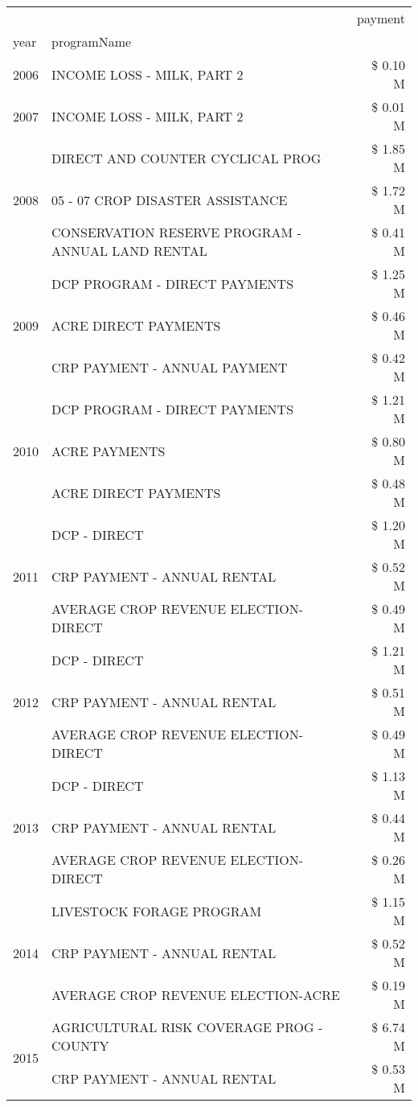 \begin{tabular}{llr}
\toprule
 &  & payment \\
year & programName &  \\
\midrule
2006 & INCOME LOSS - MILK, PART 2 & \$ 0.10 M \\
\cline{1-3}
2007 & INCOME LOSS - MILK, PART 2 & \$ 0.01 M \\
\cline{1-3}
\multirow[t]{3}{*}{2008} & DIRECT AND COUNTER CYCLICAL PROG & \$ 1.85 M \\
 & 05 - 07 CROP DISASTER ASSISTANCE & \$ 1.72 M \\
 & CONSERVATION RESERVE PROGRAM - ANNUAL LAND RENTAL & \$ 0.41 M \\
\cline{1-3}
\multirow[t]{3}{*}{2009} & DCP PROGRAM - DIRECT PAYMENTS & \$ 1.25 M \\
 & ACRE DIRECT PAYMENTS & \$ 0.46 M \\
 & CRP PAYMENT - ANNUAL PAYMENT & \$ 0.42 M \\
\cline{1-3}
\multirow[t]{3}{*}{2010} & DCP PROGRAM - DIRECT PAYMENTS & \$ 1.21 M \\
 & ACRE PAYMENTS & \$ 0.80 M \\
 & ACRE DIRECT PAYMENTS & \$ 0.48 M \\
\cline{1-3}
\multirow[t]{3}{*}{2011} & DCP - DIRECT & \$ 1.20 M \\
 & CRP PAYMENT - ANNUAL RENTAL & \$ 0.52 M \\
 & AVERAGE CROP REVENUE ELECTION-DIRECT & \$ 0.49 M \\
\cline{1-3}
\multirow[t]{3}{*}{2012} & DCP - DIRECT & \$ 1.21 M \\
 & CRP PAYMENT - ANNUAL RENTAL & \$ 0.51 M \\
 & AVERAGE CROP REVENUE ELECTION-DIRECT & \$ 0.49 M \\
\cline{1-3}
\multirow[t]{3}{*}{2013} & DCP - DIRECT & \$ 1.13 M \\
 & CRP PAYMENT - ANNUAL RENTAL & \$ 0.44 M \\
 & AVERAGE CROP REVENUE ELECTION-DIRECT & \$ 0.26 M \\
\cline{1-3}
\multirow[t]{3}{*}{2014} & LIVESTOCK FORAGE PROGRAM & \$ 1.15 M \\
 & CRP PAYMENT - ANNUAL RENTAL & \$ 0.52 M \\
 & AVERAGE CROP REVENUE ELECTION-ACRE & \$ 0.19 M \\
\cline{1-3}
\multirow[t]{3}{*}{2015} & AGRICULTURAL RISK COVERAGE PROG - COUNTY & \$ 6.74 M \\
 & CRP PAYMENT - ANNUAL RENTAL & \$ 0.53 M \\

\end{tabular}
